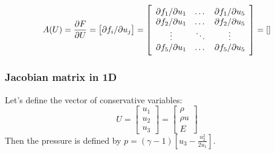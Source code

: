 \documentclass{article}
\begin{document}
\begin{equation}
  A(U)=\frac{\partial F}{\partial U} = \left[ \partial f_i/\partial u_j \right] = \left [
    \begin{array}{c c c}
      \partial f_1/\partial u_1 & \dots & \partial f_1/\partial u_5\\
      \partial f_2/\partial u_1 & \dots & \partial f_2/\partial u_5\\
      \vdots & \ddots & \vdots\\
      \partial f_5/\partial u_1 & \dots & \partial f_5/\partial u_5\\
    \end{array} \right ]
  = \left[
    \begin{array}{c c c c c}
      
    \end{array} \right ]
\end{equation}

\subsubsection*{Jacobian matrix in 1D}

Let's define the vector of conservative variables:
\begin{equation}
  U = \left[
    \begin{array}{c}
      u_1\\
      u_2\\
      u_3
    \end{array}
  \right] = \left[
    \begin{array}{c}
      \rho\\
      \rho u\\
      E
    \end{array}
  \right]
\end{equation}
Then the pressure is defined by $p=(\gamma-1)[u_3-\frac{u_2^2}{2u_1} ]$.
\end{document}
